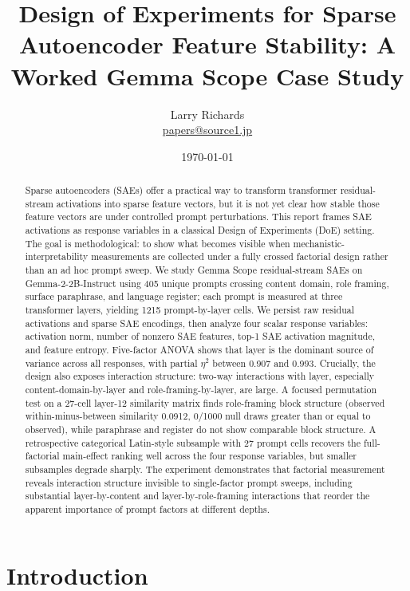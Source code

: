 \documentclass[11pt]{article}
\title{Design of Experiments for Sparse Autoencoder Feature Stability: A Worked Gemma Scope Case Study}
\author{Larry Richards\\\href{mailto:papers@source1.jp}{papers@source1.jp}}
\date{\today}
\begin{document}
\maketitle

\begin{abstract}
Sparse autoencoders (SAEs) offer a practical way to transform transformer residual-stream activations into sparse feature vectors, but it is not yet clear how stable those feature vectors are under controlled prompt perturbations. This report frames SAE activations as response variables in a classical Design of Experiments (DoE) setting. The goal is methodological: to show what becomes visible when mechanistic-interpretability measurements are collected under a fully crossed factorial design rather than an ad hoc prompt sweep. We study Gemma Scope residual-stream SAEs on Gemma-2-2B-Instruct using 405 unique prompts crossing content domain, role framing, surface paraphrase, and language register; each prompt is measured at three transformer layers, yielding 1215 prompt-by-layer cells. We persist raw residual activations and sparse SAE encodings, then analyze four scalar response variables: activation norm, number of nonzero SAE features, top-1 SAE activation magnitude, and feature entropy. Five-factor ANOVA shows that layer is the dominant source of variance across all responses, with partial $\eta^2$ between 0.907 and 0.993. Crucially, the design also exposes interaction structure: two-way interactions with layer, especially content-domain-by-layer and role-framing-by-layer, are large. A focused permutation test on a 27-cell layer-12 similarity matrix finds role-framing block structure (observed within-minus-between similarity 0.0912, 0/1000 null draws greater than or equal to observed), while paraphrase and register do not show comparable block structure. A retrospective categorical Latin-style subsample with 27 prompt cells recovers the full-factorial main-effect ranking well across the four response variables, but smaller subsamples degrade sharply. The experiment demonstrates that factorial measurement reveals interaction structure invisible to single-factor prompt sweeps, including substantial layer-by-content and layer-by-role-framing interactions that reorder the apparent importance of prompt factors at different depths.
\end{abstract}

\section{Introduction}
\end{document}
